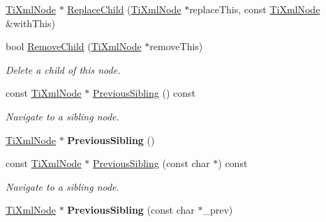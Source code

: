 \begin{DoxyCompactItemize}
\item 
\hyperlink{classTiXmlNode}{Ti\+Xml\+Node} $\ast$ \hyperlink{classTiXmlNode_a543208c2c801c84a213529541e904b9f}{Replace\+Child} (\hyperlink{classTiXmlNode}{Ti\+Xml\+Node} $\ast$replace\+This, const \hyperlink{classTiXmlNode}{Ti\+Xml\+Node} \&with\+This)
\item 
\mbox{\label{classTiXmlNode_ae19d8510efc90596552f4feeac9a8fbf}} 
bool \hyperlink{classTiXmlNode_ae19d8510efc90596552f4feeac9a8fbf}{Remove\+Child} (\hyperlink{classTiXmlNode}{Ti\+Xml\+Node} $\ast$remove\+This)
\begin{DoxyCompactList}\small\item\em Delete a child of this node. \end{DoxyCompactList}\item 
\mbox{\label{classTiXmlNode_a8aacf06b1a577ff0d7cfa502cc76da32}} 
const \hyperlink{classTiXmlNode}{Ti\+Xml\+Node} $\ast$ \hyperlink{classTiXmlNode_a8aacf06b1a577ff0d7cfa502cc76da32}{Previous\+Sibling} () const
\begin{DoxyCompactList}\small\item\em Navigate to a sibling node. \end{DoxyCompactList}\item 
\mbox{\label{classTiXmlNode_af8c0642ad6ecc03f62953e68896ed1cc}} 
\hyperlink{classTiXmlNode}{Ti\+Xml\+Node} $\ast$ {\bfseries Previous\+Sibling} ()
\item 
\mbox{\label{classTiXmlNode_ace1b618fe58b2b9305fe89bfbc8dd17b}} 
const \hyperlink{classTiXmlNode}{Ti\+Xml\+Node} $\ast$ \hyperlink{classTiXmlNode_ace1b618fe58b2b9305fe89bfbc8dd17b}{Previous\+Sibling} (const char $\ast$) const
\begin{DoxyCompactList}\small\item\em Navigate to a sibling node. \end{DoxyCompactList}\item 
\mbox{\label{classTiXmlNode_a6c977049207177ef21b51972315c2053}} 
\hyperlink{classTiXmlNode}{Ti\+Xml\+Node} $\ast$ {\bfseries Previous\+Sibling} (const char $\ast$\+\_\+prev)
\item 
\mbox{\label{classTiXmlNode_ae99c572ac7901a15993ea7a4efaa10e7}} 

\end{DoxyCompactItemize}
